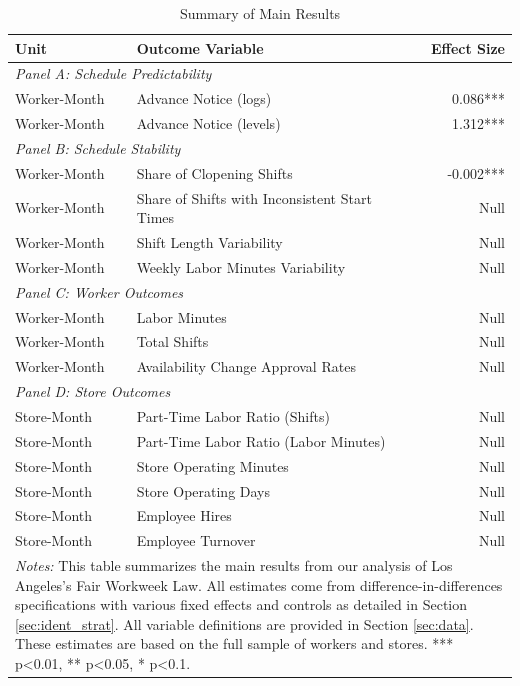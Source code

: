 \documentclass[letterpaper,11pt,leqno]{article}
\theoremstyle{paper}
\begin{document}
\begin{table}[h]
\caption{Summary of Main Results}
\scriptsize
\centering
\begin{tabularx}{\textwidth}{lXr}
\toprule
\textbf{Unit} & \textbf{Outcome Variable} & \textbf{Effect Size} \\
\midrule
\multicolumn{3}{l}{\textit{Panel A: Schedule Predictability}} \\
Worker-Month & Advance Notice (logs) & 0.086*** \\
Worker-Month & Advance Notice (levels) & 1.312*** \\
\midrule
\multicolumn{3}{l}{\textit{Panel B: Schedule Stability}} \\
Worker-Month & Share of Clopening Shifts & -0.002*** \\
Worker-Month & Share of Shifts with Inconsistent Start Times & Null \\
Worker-Month & Shift Length Variability & Null \\
Worker-Month & Weekly Labor Minutes Variability & Null \\
\midrule
\multicolumn{3}{l}{\textit{Panel C: Worker Outcomes}} \\
Worker-Month & Labor Minutes & Null \\
Worker-Month & Total Shifts & Null \\
Worker-Month & Availability Change Approval Rates & Null \\
\midrule
\multicolumn{3}{l}{\textit{Panel D: Store Outcomes}} \\
Store-Month & Part-Time Labor Ratio (Shifts) & Null \\
Store-Month & Part-Time Labor Ratio (Labor Minutes) & Null \\
Store-Month & Store Operating Minutes & Null \\
Store-Month & Store Operating Days & Null \\
Store-Month & Employee Hires & Null \\
Store-Month & Employee Turnover & Null \\
\bottomrule
\multicolumn{3}{p{\textwidth}}{\scriptsize \textit{Notes:} This table summarizes the main results from our analysis of Los Angeles's Fair Workweek Law. All estimates come from difference-in-differences specifications with various fixed effects and controls as detailed in Section \ref{sec:ident_strat}. All variable definitions are provided in Section \ref{sec:data}. These estimates are based on the full sample of workers and stores. *** p<0.01, ** p<0.05, * p<0.1. } \\
\end{tabularx}
\label{table:results_summary}
\end{table}
\end{document}
